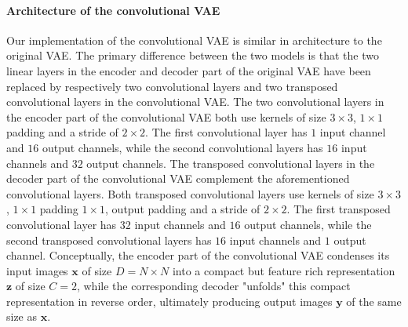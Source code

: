
\paragraph{Architecture of the convolutional VAE}
Our implementation of the convolutional VAE is similar in architecture to the original VAE\@. The primary difference between the two models is that the two linear layers in the encoder and decoder part of the original VAE have been replaced by respectively two convolutional layers and two transposed convolutional layers in the convolutional VAE\@. The two convolutional layers in the encoder part of the convolutional VAE both use kernels of size $3\times 3$, $1\times 1$ padding and a stride of $2\times2$. The first convolutional layer has $1$ input channel and $16$ output channels, while the second convolutional layers has $16$ input channels and $32$ output channels. \iffalse As such, each convolutional layer decreases the spatial dimensions of their input by a factor of $2$, and the second convolutional layer additionally increases the feature dimension of its input by a factor $2$ to offset the loss in spatial dimensions. \fi The transposed convolutional layers in the decoder part of the convolutional VAE complement the aforementioned convolutional layers. Both transposed convolutional layers use kernels of size $3\times3$, $1\times 1$ padding $1\times 1$, output padding and a stride of $2\times 2$. The first transposed convolutional layer has $32$ input channels and $16$ output channels, while the second transposed convolutional layers has $16$ input channels and $1$ output channel. \iffalse As such, each transposed convolutional layers "undoes" the spatial reduction produced by a corresponding prior convolutional layer by upsampling the spatial dimensions of its input with a factor of $2$. \fi Conceptually, the encoder part of the convolutional VAE condenses its input images $\bm{x}$ of size $D = N \times N$ into a compact but feature rich representation $\bm{z}$ of size $C = 2$, while the corresponding decoder "unfolds" this compact representation in reverse order, ultimately producing output images $\bm{y}$ of the same size as $\bm{x}$. 
